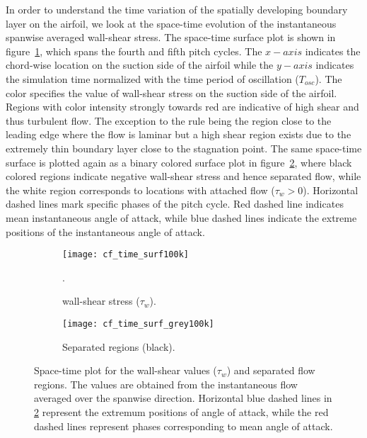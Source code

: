 In order to understand the time variation of the spatially developing boundary layer on the airfoil, we look at the space-time evolution of the instantaneous spanwise averaged wall-shear stress. The space-time surface plot is shown in figure~\ref{fig:cf-time}, which spans the fourth and fifth pitch cycles. The $x-axis$ indicates the chord-wise location on the suction side of the airfoil while the $y-axis$ indicates the simulation time normalized with the time period of oscillation ($T_{osc}$). The color specifies the value of wall-shear stress on the suction side of the airfoil. Regions with color intensity strongly towards red are indicative of high shear and thus turbulent flow. The exception to the rule being the region close to the leading edge where the flow is laminar but a high shear region exists due to the extremely thin boundary layer close to the stagnation point. The same space-time surface is plotted again as a binary colored surface plot in figure~\ref{fig:separation-time}, where black colored regions indicate negative wall-shear stress and hence separated flow, while the white region corresponds to locations with attached flow ($\tau_{w}>0$). Horizontal dashed lines mark specific phases of the pitch cycle. Red dashed line indicates mean instantaneous angle of attack, while blue dashed lines indicate the extreme positions of the instantaneous angle of attack. 
\begin{figure}[h]
	\centering
	\begin{subfigure}[t]{0.46\textwidth}
		\centering
		\texttt{[image: cf\_time\_surf100k]}
		\caption{wall-shear stress ($\tau_{w}$).}. 
		\label{fig:cf-time}
	\end{subfigure}
	\begin{subfigure}[t]{0.45\textwidth}
		\centering
		\texttt{[image: cf\_time\_surf\_grey100k]}
		\caption{Separated regions (black).} 
		\label{fig:separation-time}
	\end{subfigure}
	\caption{Space-time plot for the wall-shear values ($\tau_{w}$) and separated flow regions. The values are obtained from the instantaneous flow averaged over the spanwise direction. Horizontal blue dashed lines in \ref{fig:separation-time} represent the extremum positions of angle of attack, while the red dashed lines represent phases corresponding to mean angle of attack.}
	\label{fig:space-time}
\end{figure}

